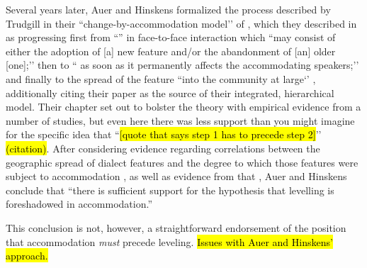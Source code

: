     Several years later, Auer and Hinskens \citeyearpar{auer1996convergence,auer2005role} formalized the process described by Trudgill in their ``change-by-accommodation model’’ of \cidc{}, which they described in \citeyear{auer2005role} as progressing first from ``\sta{}'' in face-to-face interaction which ``may consist of either the adoption of [a] new feature and/or the abandonment of [an] older [one];’’ then to ``\lta{} as soon as it permanently affects the accommodating speakers;’’ and finally to the spread of the feature ``into the community at large‘’  \cite[p.335-6]{auer2005role}, additionally citing their \citeyear{auer1996convergence} paper as the source of their integrated, hierarchical model. Their \citeyear{auer2005role} chapter set out to bolster the theory with empirical evidence from a number of studies, but even here there was less support than you might imagine for the specific idea that ``\hl{[quote that says step 1 has to precede step 2]}’’ \hl{(citation)}. After considering evidence regarding correlations between the geographic spread of dialect features and the degree to which those features were subject to accommodation \citep{hinskens1992dialect}, as well as evidence from \cite{gilles1999dialektausgleich} that , Auer and Hinskens conclude that ``there is sufficient support for the hypothesis that levelling is foreshadowed in accommodation.''
    
    This conclusion is not, however, a straightforward endorsement of the position that accommodation \emph{must} precede leveling. \hl{Issues with Auer and Hinskens' approach.}
    

